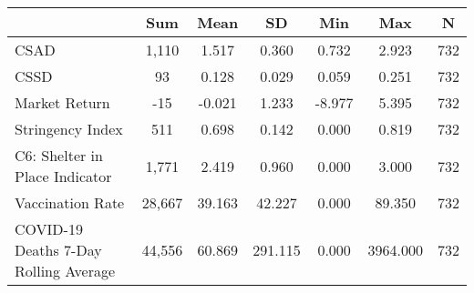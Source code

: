 {
\def\sym#1{\ifmmode^{#1}\else\(^{#1}\)\fi}
\begin{tabular}{l*{1}{cccccc}}
\toprule
                    &         Sum&        Mean&          SD&         Min&         Max&           N\\
\midrule
CSAD                &       1,110&       1.517&       0.360&       0.732&       2.923&         732\\
CSSD                &          93&       0.128&       0.029&       0.059&       0.251&         732\\
Market Return       &         -15&      -0.021&       1.233&      -8.977&       5.395&         732\\
Stringency Index    &         511&       0.698&       0.142&       0.000&       0.819&         732\\
C6: Shelter in Place Indicator&       1,771&       2.419&       0.960&       0.000&       3.000&         732\\
Vaccination Rate    &      28,667&      39.163&      42.227&       0.000&      89.350&         732\\
COVID-19 Deaths 7-Day Rolling Average&      44,556&      60.869&     291.115&       0.000&    3964.000&         732\\
\bottomrule
\end{tabular}
}
